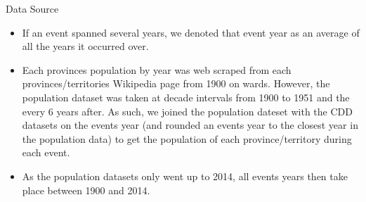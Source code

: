 \begin{frame}{Data Source}
\begin{itemize}
	\item If an event spanned several years, we denoted that event year as an average of all the years it occurred over. 
	\item Each provinces population by year was web scraped from each provinces/territories Wikipedia page from 1900 on wards. However, the population dataset was taken at decade intervals from 1900 to 1951 and the every 6 years after. As such, we joined the population dateset with the CDD datasets on the events year (and rounded an events year to the closest year in the population data) to get the population of each province/territory during each event.
	\item As the population datasets only went up to 2014, all events years then take place between 1900 and 2014.
\end{itemize}
\end{frame}